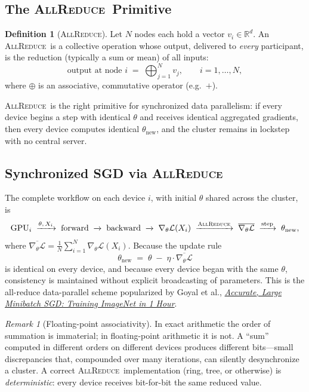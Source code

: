 \documentclass[11pt,a4paper]{article}
\theoremstyle{definition}
\newtheorem{definition}{Definition}[section]
\theoremstyle{remark}
\newtheorem*{remark}{Remark}
\theoremstyle{plain}
\newcommand{\GPU}[1]{\mathrm{GPU}_{#1}}
\newcommand{\grad}{\nabla_{\theta}}
\newcommand{\Loss}{\mathcal{L}}
\newcommand{\allreduce}{\textsc{AllReduce}}
\begin{document}
\subsection{The \allreduce\ Primitive}

\begin{definition}[\allreduce]
Let $N$ nodes each hold a vector $v_i \in \mathbb{R}^d$. An \allreduce\ is
a collective operation whose output, delivered to \emph{every}
participant, is the reduction (typically a sum or mean) of all inputs:
\[
   \text{output at node } i \;=\; \bigoplus_{j=1}^{N} v_j,
   \qquad i = 1,\ldots,N,
\]
where $\oplus$ is an associative, commutative operator (e.g.\ $+$).
\end{definition}

\allreduce\ is the right primitive for synchronized data parallelism: if
every device begins a step with identical $\theta$ and receives identical
aggregated gradients, then every device computes identical
$\theta_{\text{new}}$, and the cluster remains in lockstep with no
central server.

\subsection{Synchronized SGD via \allreduce}

The complete workflow on each device $i$, with initial $\theta$ shared
across the cluster, is
\[
   \GPU{i} \;\xrightarrow{\theta,\,X_i}\;
   \text{forward} \;\xrightarrow{}\;
   \text{backward} \;\xrightarrow{}\;
   \grad \Loss(X_i) \;\xrightarrow{\allreduce}\;
   \overline{\grad \Loss} \;\xrightarrow{\text{step}}\;
   \theta_{\text{new}},
\]
where
$\overline{\grad \Loss} = \tfrac{1}{N}\sum_{i=1}^N \grad \Loss(X_i)$.
Because the update rule
\[
   \theta_{\text{new}} \;=\; \theta \;-\; \eta \cdot \overline{\grad \Loss}
\]
is identical on every device, and because every device began with the same
$\theta$, consistency is maintained without explicit broadcasting of
parameters. This is the all-reduce data-parallel scheme popularized by
Goyal et al., \href{https://arxiv.org/abs/1706.02677}{\textit{Accurate,
Large Minibatch SGD: Training ImageNet in 1 Hour}}.

\begin{remark}[Floating-point associativity]
In exact arithmetic the order of summation is immaterial; in
floating-point arithmetic it is not. A ``sum'' computed in different
orders on different devices produces different bits---small discrepancies
that, compounded over many iterations, can silently desynchronize a
cluster. A correct \allreduce\ implementation (ring, tree, or otherwise)
is \emph{deterministic}: every device receives bit-for-bit the same
reduced value.
\end{remark}
\end{document}
